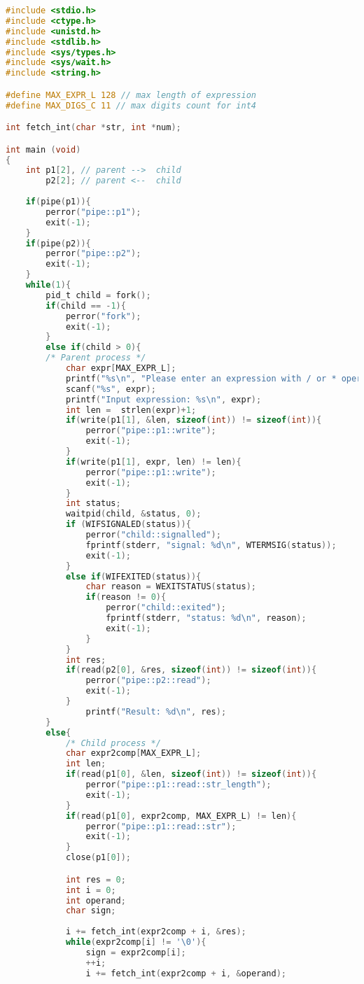 \documentclass[12pt]{article}
\begin{document}
\begin{lstlisting}[language=C, basicstyle=\scriptsize]
#include <stdio.h>
#include <ctype.h>
#include <unistd.h>
#include <stdlib.h>
#include <sys/types.h>
#include <sys/wait.h>
#include <string.h>

#define MAX_EXPR_L 128 // max length of expression 
#define MAX_DIGS_C 11 // max digits count for int4

int fetch_int(char *str, int *num);

int main (void)
{
	int p1[2], // parent -->  child
		p2[2]; // parent <--  child
		
	if(pipe(p1)){
		perror("pipe::p1");
    	exit(-1);
	}
	if(pipe(p2)){
		perror("pipe::p2");
    	exit(-1);
	}
    while(1){
    	pid_t child = fork();
	    if(child == -1){
	    	perror("fork");
	    	exit(-1);
	    }
	    else if(child > 0){
	    /* Parent process */
		    char expr[MAX_EXPR_L];
			printf("%s\n", "Please enter an expression with / or * operations only");
			scanf("%s", expr);
			printf("Input expression: %s\n", expr);
		    int len =  strlen(expr)+1;
		    if(write(p1[1], &len, sizeof(int)) != sizeof(int)){
		    	perror("pipe::p1::write");
		    	exit(-1);
		    }
		    if(write(p1[1], expr, len) != len){
		    	perror("pipe::p1::write");
		    	exit(-1);
		    }
		    int status;
		    waitpid(child, &status, 0);
		    if (WIFSIGNALED(status)){
		    	perror("child::signalled");
		    	fprintf(stderr, "signal: %d\n", WTERMSIG(status));
		    	exit(-1);
		    }
		    else if(WIFEXITED(status)){
		    	char reason = WEXITSTATUS(status);
		    	if(reason != 0){
			    	perror("child::exited");
			    	fprintf(stderr, "status: %d\n", reason);
				    exit(-1);
				}
		    }
		    int res;
		    if(read(p2[0], &res, sizeof(int)) != sizeof(int)){
		    	perror("pipe::p2::read");
		    	exit(-1);
		    }
		    	printf("Result: %d\n", res);
	    }
	    else{
	    	/* Child process */
	    	char expr2comp[MAX_EXPR_L];
	    	int len;
	    	if(read(p1[0], &len, sizeof(int)) != sizeof(int)){
				perror("pipe::p1::read::str_length");
	    		exit(-1);
	    	}
	    	if(read(p1[0], expr2comp, MAX_EXPR_L) != len){
	    	 	perror("pipe::p1::read::str");
	    	 	exit(-1);
	    	}
	    	close(p1[0]);

	    	int res = 0;
	    	int i = 0;
	    	int operand;
	    	char sign;
	    	
	    	i += fetch_int(expr2comp + i, &res);
	    	while(expr2comp[i] != '\0'){
	    		sign = expr2comp[i];
	    		++i;
	    		i += fetch_int(expr2comp + i, &operand);


\end{lstlisting}
\end{document}
